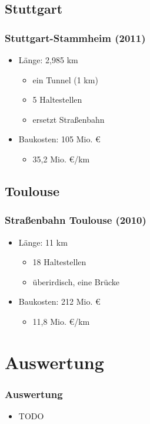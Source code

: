 \documentclass[xcolor=dvipsnames]{beamer}
\begin{document}

\subsection{Stuttgart}
\begin{frame}
  \frametitle{Stuttgart-Stammheim (2011)}

  \begin{itemize}
    \item Länge: 2,985 km
      \begin{itemize}
        \item ein Tunnel (1 km)
        \item 5 Haltestellen
        \item ersetzt Straßenbahn
      \end{itemize}
    \item Baukosten: 105 Mio. €
    \begin{itemize}
        \item 35,2 Mio. €/km
    \end{itemize}
  \end{itemize}
\end{frame}

\subsection{Toulouse}
\begin{frame}
  \frametitle{Straßenbahn Toulouse (2010)}
  \begin{itemize}
    \item Länge: 11 km
      \begin{itemize}
        \item 18 Haltestellen
        \item überirdisch, eine Brücke
      \end{itemize}
    \item Baukosten: 212 Mio. €
    \begin{itemize}
        \item 11,8 Mio. €/km
    \end{itemize}
  \end{itemize}
\end{frame}


\section{Auswertung}
\begin{frame}
    \frametitle{Auswertung}
    \begin{itemize}
      \item TODO
    \end{itemize}
\end{frame}
\end{document}
